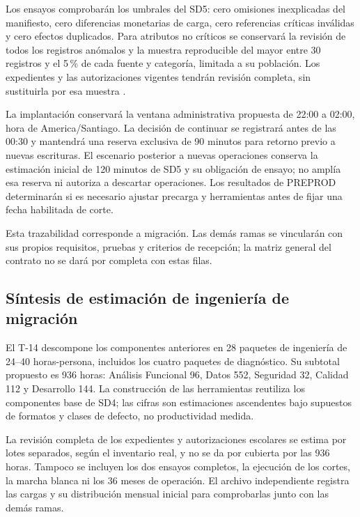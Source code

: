 Los ensayos comprobarán los umbrales del SD5: cero omisiones inexplicadas del manifiesto, cero diferencias monetarias de carga, cero referencias críticas inválidas y cero efectos duplicados. Para atributos no críticos se conservará la revisión de todos los registros anómalos y la muestra reproducible del mayor entre 30 registros y el 5\,\% de cada fuente y categoría, limitada a su población. Los expedientes y las autorizaciones vigentes tendrán revisión completa, sin sustituirla por esa muestra \parencite[cap.~5, RT-05.12--RT-05.14; pp.~11--13]{bases-transversales}.

La implantación conservará la ventana administrativa propuesta de 22:00 a 02:00, hora de America/Santiago. La decisión de continuar se registrará antes de las 00:30 y mantendrá una reserva exclusiva de 90 minutos para retorno previo a nuevas escrituras. El escenario posterior a nuevas operaciones conserva la estimación inicial de 120 minutos de SD5 y su obligación de ensayo; no amplía esa reserva ni autoriza a descartar operaciones. Los resultados de PREPROD determinarán si es necesario ajustar precarga y herramientas antes de fijar una fecha habilitada de corte.

Esta trazabilidad corresponde a migración. Las demás ramas se vincularán con sus propios requisitos, pruebas y criterios de recepción; la matriz general del contrato no se dará por completa con estas filas.

\subsection{Síntesis de estimación de ingeniería de migración}
El T-14 descompone los componentes anteriores en 28 paquetes de ingeniería de 24--40 horas-persona, incluidos los cuatro paquetes de diagnóstico. Su subtotal propuesto es 936 horas: Análisis Funcional 96, Datos 552, Seguridad 32, Calidad 112 y Desarrollo 144. La construcción de las herramientas reutiliza los componentes base de SD4; las cifras son estimaciones ascendentes bajo supuestos de formatos y clases de defecto, no productividad medida.

La revisión completa de los expedientes y autorizaciones escolares se estima por lotes separados, según el inventario real, y no se da por cubierta por las 936 horas. Tampoco se incluyen los dos ensayos completos, la ejecución de los cortes, la marcha blanca ni los 36 meses de operación. El archivo independiente  registra las cargas y su distribución mensual inicial para comprobarlas junto con las demás ramas.
